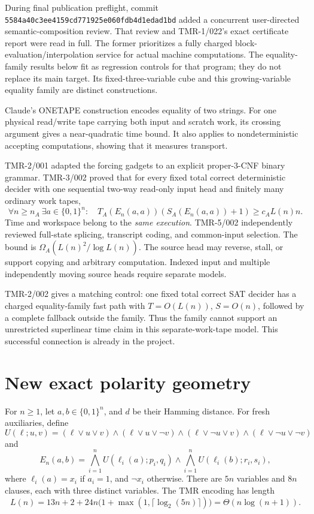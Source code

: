 \documentclass[11pt]{article}
\begin{document}
During final publication preflight, commit \texttt{5584a40c3ee4159cd771925e060fdb4d1edad1bd} added a concurrent user-directed semantic-composition review. That review and TMR-1/022's exact certificate report were read in full. The former prioritizes a fully charged block-evaluation/interpolation service for actual machine computations. The equality-family results below fit as regression controls for that program; they do not replace its main target. Its fixed-three-variable cube and this growing-variable equality family are distinct constructions.

Claude's ONETAPE construction encodes equality of two strings. For one physical read/write tape carrying both input and scratch work, its crossing argument gives a near-quadratic time bound. It also applies to nondeterministic accepting computations, showing that it measures transport.

TMR-2/001 adapted the forcing gadgets to an explicit proper-3-CNF binary grammar. TMR-3/002 proved that for every fixed total correct deterministic decider with one sequential two-way read-only input head and finitely many ordinary work tapes,
\[
\forall n\ge n_A\ \exists a\in\{0,1\}^n:
\quad T_A(E_n(a,a))(S_A(E_n(a,a))+1)\ge c_A L(n)n.
\]
Time and workspace belong to the \emph{same execution}. TMR-5/002 independently reviewed full-state splicing, transcript coding, and common-input selection. The bound is
\(\Omega_A(L(n)^2/\log L(n))\).
The source head may reverse, stall, or support copying and arbitrary computation. Indexed input and multiple independently moving source heads require separate models.

TMR-2/002 gives a matching control: one fixed total correct SAT decider has a charged equality-family fast path with \(T=O(L(n))\), \(S=O(n)\), followed by a complete fallback outside the family. Thus the family cannot support an unrestricted superlinear time claim in this separate-work-tape model. This successful connection is already in the project.

\section{New exact polarity geometry}
For \(n\ge1\), let \(a,b\in\{0,1\}^n\), and \(d\) be their Hamming distance. For fresh auxiliaries, define
\[
U(\ell;u,v)=
(\ell\lor u\lor v)\land(\ell\lor u\lor\neg v)
\land(\ell\lor\neg u\lor v)\land(\ell\lor\neg u\lor\neg v)
\]
and
\[
E_n(a,b)=
\bigwedge_{i=1}^n U(\ell_i(a);p_i,q_i)
\land
\bigwedge_{i=1}^n U(\ell_i(b);r_i,s_i),
\]
where \(\ell_i(a)=x_i\) if \(a_i=1\), and \(\neg x_i\) otherwise.
There are \(5n\) variables and \(8n\) clauses, each with three distinct variables.
The TMR encoding has length
\[
L(n)=13n+2+24n\bigl(1+\max(1,\lceil\log_2(5n)\rceil)\bigr)
=\Theta(n\log(n+1)).
\]
\end{document}
